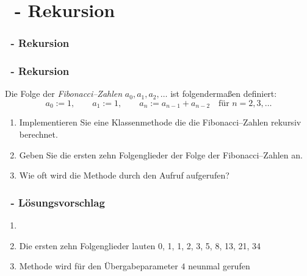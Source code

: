 \def\stitle{\theexercise\ - Rekursion}
\section{\stitle}
\begin{frame}
  \frametitle{\stitle}%
\tableofcontents[current]
\end{frame}


\begin{frame}%
  \frametitle{\stitle}%

Die Folge der \emph{Fibonacci--Zahlen} $a_0, a_1, a_2, \dotsc$ ist folgendermaßen definiert:
\begin{equation*}
a_0 := 1,\qquad
a_1 := 1,\qquad
a_n := a_{n-1} + a_{n-2}\quad\text{f\"ur } n = 2,3,\dotsc
\end{equation*}

\begin{enumerate}
\item Implementieren Sie eine Klassenmethode die die Fibonacci--Zahlen rekursiv berechnet.
\item Geben Sie die ersten zehn Folgenglieder der Folge der Fibonacci--Zahlen an.
\item Wie oft wird die Methode durch den Aufruf  aufgerufen?
\end{enumerate}
\end{frame}


\begin{frame}%
  \frametitle{\theexercise\ - L\"osungsvorschlag}%
\begin{enumerate}
\item 
\item Die ersten zehn Folgenglieder lauten 0, 1, 1, 2, 3, 5, 8, 13, 21, 34
\item Methode  wird für den Übergabeparameter $4$ neunmal gerufen
\end{enumerate}
\end{frame}
